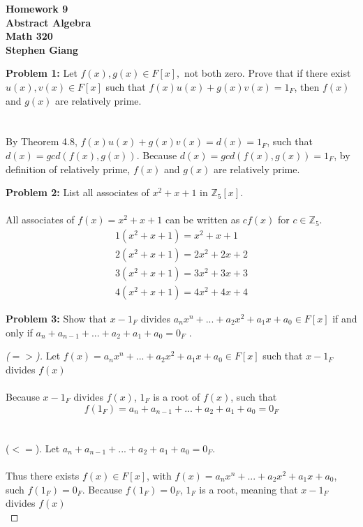 \documentclass[12pt]{article}
\begin{document}
	
	\begin{center}
		\textbf{Homework 9} \\
		\textbf{Abstract Algebra} \\
		\textbf{Math 320} \\
		\textbf{Stephen Giang} \\
	\end{center}

\noindent \textbf{Problem 1: }Let $f(x), g(x) \in F[x],$ not both zero. Prove that if there exist $u(x), v(x) \in
F[x]$ such that $f(x)u(x) + g(x)v(x) = 1_F$, then $f(x)$ and $g(x)$ are relatively prime.
\\ \\ \\
By Theorem 4.8, $f(x)u(x) + g(x)v(x) = d(x) = 1_F$, such that $d(x) = gcd(f(x),g(x))$. Because $d(x) = gcd(f(x),g(x)) = 1_F$, by definition of relatively prime, $f(x)$ and $g(x)$ are relatively prime.

\newpage 

\noindent \textbf{Problem 2: }List all associates of $x^2 + x + 1$ in $\mathbb{Z}_5[x]$.
\\ \\
All associates of $f(x) = x^2 + x + 1$ can be written as $cf(x)$ for $c \in \mathbb{Z}_5$.
	\begin{align*}
		1(x^2 + x + 1) = x^2 + x + 1 \\
		2(x^2 + x + 1) = 2x^2 + 2x + 2 \\
		3(x^2 + x + 1) = 3x^2 + 3x + 3 \\
		4(x^2 + x + 1) = 4x^2 + 4x + 4
	\end{align*}
	
\newpage 

\noindent \textbf{Problem 3: }Show that $x - 1_F$ divides $a_nx^n + ... + a_2x^2 + a_1x + a_0 \in F[x]$ if and only if $a_n + a_{n-1} + ... + a_2 + a_1 + a_0 = 0_F$ .
\\
	\begin{proof}[($=>$)]
		Let $f(x) = a_nx^n + ... + a_2x^2 + a_1x + a_0 \in F[x]$ such that $x - 1_F$ divides $f(x)$
		\\ \\
		Because $x - 1_F$ divides $f(x)$, $1_F$ is a root of $f(x)$, such that 
		$$
		f(1_F) = a_n + a_{n-1} + ... + a_2 + a_1 + a_0 = 0_F
		$$ 
		\\ \\
		($<=$). Let $a_n + a_{n-1} + ... + a_2 + a_1 + a_0 = 0_F$. 
		\\ \\
		Thus there exists $f(x) \in F[x]$, with $f(x) = a_nx^n + ... + a_2x^2 + a_1x + a_0$, such $f(1_F) = 0_F$. Because $f(1_F) = 0_F$, $1_F$ is a root, meaning that $x - 1_F$ divides $f(x)$ 
		\\
	\end{proof}
\end{document}
